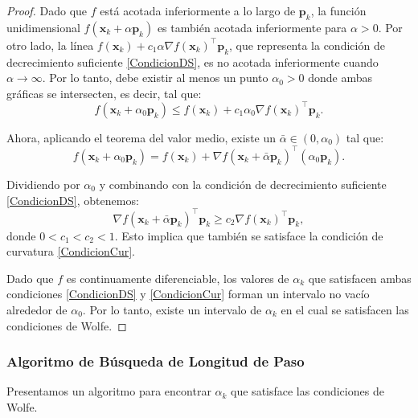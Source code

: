 \begin{proof}
Dado que $f$ está acotada inferiormente a lo largo de $\mathbf{p}_k$, la función unidimensional $f(\mathbf{x}_k + \alpha \mathbf{p}_k)$ es también acotada inferiormente para $\alpha > 0$. Por otro lado, la línea $f(\mathbf{x}_k) + c_1 \alpha \nabla f(\mathbf{x}_k)^\top \mathbf{p}_k$, que representa la condición de decrecimiento suficiente \ref{CondicionDS}, es no acotada inferiormente cuando $\alpha \to \infty$. Por lo tanto, debe existir al menos un punto $\alpha_0 > 0$ donde ambas gráficas se intersecten, es decir, tal que:
\[
f(\mathbf{x}_k + \alpha_0 \mathbf{p}_k) \leq f(\mathbf{x}_k) + c_1 \alpha_0 \nabla f(\mathbf{x}_k)^\top \mathbf{p}_k.
\]

Ahora, aplicando el teorema del valor medio, existe un $\bar{\alpha} \in (0, \alpha_0)$ tal que:
\[
f(\mathbf{x}_k + \alpha_0 \mathbf{p}_k) = f(\mathbf{x}_k) + \nabla f(\mathbf{x}_k + \bar{\alpha} \mathbf{p}_k)^\top (\alpha_0 \mathbf{p}_k).
\]

Dividiendo por $\alpha_0$ y combinando con la condición de decrecimiento suficiente \ref{CondicionDS}, obtenemos:
\[
\nabla f(\mathbf{x}_k + \bar{\alpha} \mathbf{p}_k)^\top \mathbf{p}_k \geq c_2 \nabla f(\mathbf{x}_k)^\top \mathbf{p}_k,
\]
donde $0 < c_1 < c_2 < 1$. Esto implica que también se satisface la condición de curvatura \ref{CondicionCur}.

Dado que $f$ es continuamente diferenciable, los valores de $\alpha_k$ que satisfacen ambas condiciones \ref{CondicionDS} y \ref{CondicionCur} forman un intervalo no vacío alrededor de $\alpha_0$. Por lo tanto, existe un intervalo de $\alpha_k$ en el cual se satisfacen las condiciones de Wolfe.
\end{proof}


\subsubsection{Algoritmo de Búsqueda de Longitud de Paso}

Presentamos un algoritmo para encontrar $\alpha_k$ que satisface las condiciones de Wolfe.

